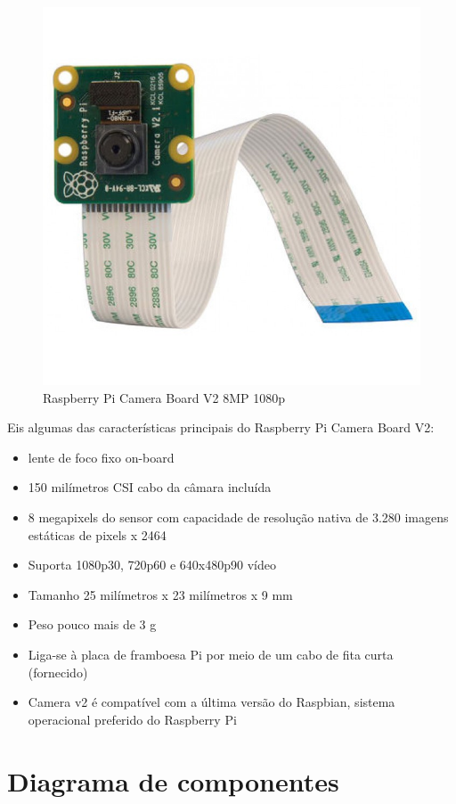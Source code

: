 \begin{figure}[!htb]
	\centering
	\includegraphics[width=0.3\linewidth]{img/hardware/camera_v2.jpg}
	\caption{Raspberry Pi Camera Board V2 8MP 1080p}
	\label{raspicam}
\end{figure}


Eis algumas das características principais do Raspberry Pi Camera Board V2:

\begin{itemize}
	\item lente de foco fixo on-board
	\item 150 milímetros CSI cabo da câmara incluída
	\item 8 megapixels do sensor com capacidade de resolução nativa de 3.280 imagens estáticas de pixels x 2464
	\item Suporta 1080p30, 720p60 e 640x480p90 vídeo
	\item Tamanho 25 milímetros x 23 milímetros x 9 mm
	\item Peso pouco mais de 3 g
	\item Liga-se à placa de framboesa Pi por meio de um cabo de fita curta (fornecido)
	\item Camera v2 é compatível com a última versão do Raspbian, sistema operacional preferido do Raspberry Pi
\end{itemize}







\newpage
\section{Diagrama de componentes}

